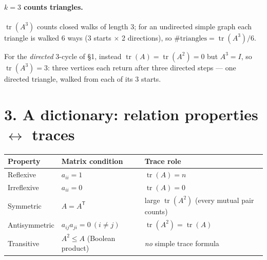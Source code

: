 \documentclass[11pt]{article}
\newcommand{\tr}{\operatorname{tr}}
\newcommand{\smallmat}[1]{\left(\begin{smallmatrix}#1\end{smallmatrix}\right)}
\begin{document}
\paragraph{$k=3$ counts triangles.}
$\tr(A^{3})$ counts closed walks of length $3$; for an undirected simple graph
each triangle is walked $6$ ways (3 starts $\times$ 2 directions), so
$\#\text{triangles}=\tr(A^{3})/6$.

\begin{center}
\end{center}

\noindent For the \emph{directed} $3$-cycle of \S1, instead $\tr(A)=\tr(A^{2})=0$
but $A^{3}=I$, so $\tr(A^{3})=3$: three vertices each return after three
directed steps --- one directed triangle, walked from each of its $3$ starts.

\section*{3. A dictionary: relation properties $\leftrightarrow$ traces}

\begin{center}
\renewcommand{\arraystretch}{1.35}
\begin{tabular}{@{}l l l@{}}
\toprule
\textbf{Property} & \textbf{Matrix condition} & \textbf{Trace role}\\
\midrule
Reflexive & $a_{ii}=1$ & $\tr(A)=n$\\
Irreflexive & $a_{ii}=0$ & $\tr(A)=0$\\
Symmetric & $A=A^{\mathsf T}$ & large $\tr(A^{2})$ (every mutual pair counts)\\
Antisymmetric & $a_{ij}a_{ji}=0\ (i\neq j)$ & $\tr(A^{2})=\tr(A)$\\
Transitive & $A^{2}\le A$ (Boolean product) & \emph{no} simple trace formula\\
\bottomrule
\end{tabular}
\end{center}
\end{document}
